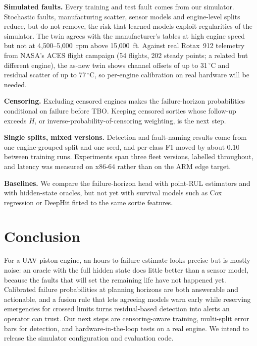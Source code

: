 \noindent\textbf{Simulated faults.} Every training and test fault comes from our simulator. Stochastic faults, manufacturing scatter, sensor models and engine-level splits reduce, but do not remove, the risk that learned models exploit regularities of the simulator. The twin agrees with the manufacturer's tables at high engine speed but not at 4,500--5,000~rpm above 15,000~ft. Against real Rotax~912 telemetry from NASA's ACES flight campaign (54 flights, 202 steady points; a related but different engine), the as-new twin shows channel offsets of up to 31\,$^\circ$C and residual scatter of up to 77\,$^\circ$C, so per-engine calibration on real hardware will be needed.

\noindent\textbf{Censoring.} Excluding censored engines makes the failure-horizon probabilities conditional on failure before TBO. Keeping censored sorties whose follow-up exceeds $H$, or inverse-probability-of-censoring weighting, is the next step.

\noindent\textbf{Single splits, mixed versions.} Detection and fault-naming results come from one engine-grouped split and one seed, and per-class F1 moved by about 0.10 between training runs. Experiments span three fleet versions, labelled throughout, and latency was measured on x86-64 rather than on the ARM edge target.

\noindent\textbf{Baselines.} We compare the failure-horizon head with point-RUL estimators and with hidden-state oracles, but not yet with survival models such as Cox regression \citep{cox1972} or DeepHit \citep{lee2018deephit} fitted to the same sortie features.

\section{Conclusion}

For a UAV piston engine, an hours-to-failure estimate looks precise but is mostly noise: an oracle with the full hidden state does little better than a sensor model, because the faults that will set the remaining life have not happened yet. Calibrated failure probabilities at planning horizons are both answerable and actionable, and a fusion rule that lets agreeing models warn early while reserving emergencies for crossed limits turns residual-based detection into alerts an operator can trust. Our next steps are censoring-aware training, multi-split error bars for detection, and hardware-in-the-loop tests on a real engine. We intend to release the simulator configuration and evaluation code.
